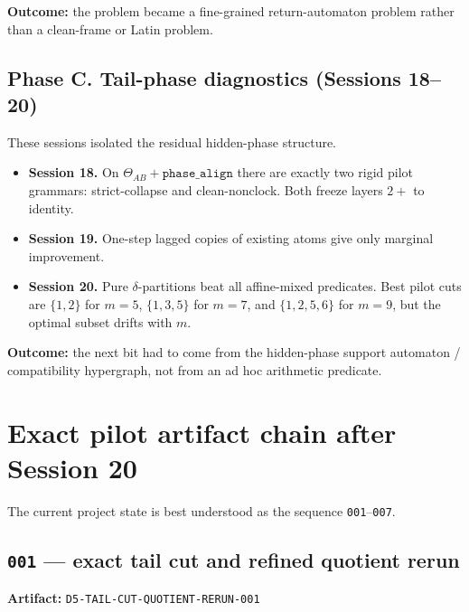 \documentclass[11pt]{article}
\begin{document}
\textbf{Outcome:} the problem became a fine-grained return-automaton problem rather than a clean-frame or Latin problem.

\subsection*{Phase C. Tail-phase diagnostics (Sessions 18--20)}

These sessions isolated the residual hidden-phase structure.

\begin{itemize}
    \item \textbf{Session 18.} On $\Theta_{AB}+\texttt{phase\_align}$ there are exactly two rigid pilot grammars: strict-collapse and clean-nonclock. Both freeze layers $2+$ to identity.
    \item \textbf{Session 19.} One-step lagged copies of existing atoms give only marginal improvement.
    \item \textbf{Session 20.} Pure $\delta$-partitions beat all affine-mixed predicates. Best pilot cuts are $\{1,2\}$ for $m=5$, $\{1,3,5\}$ for $m=7$, and $\{1,2,5,6\}$ for $m=9$, but the optimal subset drifts with $m$.
\end{itemize}

\textbf{Outcome:} the next bit had to come from the hidden-phase support automaton / compatibility hypergraph, not from an ad hoc arithmetic predicate.

\section*{Exact pilot artifact chain after Session 20}

The current project state is best understood as the sequence \texttt{001}--\texttt{007}.

\subsection*{\texttt{001} --- exact tail cut and refined quotient rerun}

\textbf{Artifact:} \texttt{D5-TAIL-CUT-QUOTIENT-RERUN-001}
\end{document}
